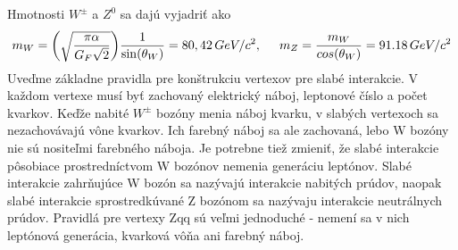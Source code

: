 \documentclass[../../main.tex]{subfiles}
\begin{document}
Hmotnosti $W^{\pm}$ a $Z^0$ sa dajú vyjadriť ako 
$$
m_W=\bigg(\sqrt{\frac{\pi \alpha}{G_F\sqrt{2}}}\bigg)\frac{1}{\sin(\theta_W)}=80,42\,GeV/c^2, \hspace{0.5cm} m_Z=\frac{m_W}{cos(\theta_W)}=91.18\,GeV/c^2
$$
Uveďme základne pravidla pre konštrukciu vertexov pre slabé interakcie. V každom vertexe musí byť zachovaný elektrický náboj, leptonové číslo a počet kvarkov. Keďže nabité $W^{\pm}$ bozóny menia náboj kvarku, v slabých vertexoch sa nezachovávajú vône kvarkov. Ich farebný náboj sa ale zachovaná, lebo W bozóny nie sú nositeľmi farebného náboja. Je potrebne tiež zmieniť, že slabé interakcie pôsobiace prostredníctvom W bozónov nemenia generáciu leptónov. Slabé interakcie zahrňujúce W bozón sa nazývajú interakcie nabitých prúdov, naopak slabé interakcie sprostredkúvané Z bozónom sa nazývaju interakcie neutrálnych prúdov. Pravidlá pre vertexy Zqq sú veľmi jednoduché - nemení sa v nich leptónová generácia, kvarková vôňa ani farebný náboj.
\end{document}
